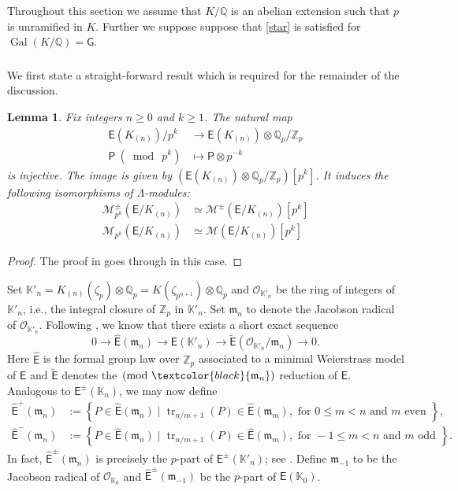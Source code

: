 \documentclass{amsart}
\newcommand{\edit}[1]{\textcolor{black}{#1}}
\newtheorem{lemma}[theorem]{Lemma}
\numberwithin{equation}{section}
\theoremstyle{remark}
\newcommand{\tr}{\operatorname{tr}}
\newcommand{\EC}{\mathsf{E}}
\newcommand{\fm}{\mathfrak{m}}
\newcommand{\cM}{\mathcal{M}}
\newcommand{\Gal}{\operatorname{Gal}}
\newcommand{\Qp}{\mathbb{Q}_p}
\newcommand{\Kn}{\mathbb{K}_{n}}
\newcommand{\K}{\mathbb{K}}
\newcommand{\Zp}{\mathbb{Z}_p}
\newcommand{\Q}{\mathbb{Q}}
\theoremstyle{plain} %
\begin{document}
Throughout this section we assume that $K/\Q$ is an abelian extension such that $p$ is unramified in $K$.
Further we suppose suppose that \ref{star} is satisfied for $\Gal(K/\Q) = \mathsf{G}$.


\subsubsection{}
We first state a straight-forward result which is required for the remainder of the discussion.

\begin{lemma}
\label{Antonio 5.8}
Fix integers $n \geq 0$ and $k \geq 1$.
The natural map 
\begin{align*}
\EC(K_{(n)})/p^k &\longrightarrow \EC(K_{(n)}) \otimes \Qp/\Zp \\
\mathsf{P} \ (\bmod \ p^k) & \mapsto \mathsf{P} \otimes p^{-k}
\end{align*} 
is injective.
The image is given by $(\EC(K_{(n)}) \otimes \Qp/\Zp)[p^k]$.
It induces the following isomorphisms of $\Lambda$-modules:
\begin{align*}
\cM^{\pm}_{p^k}(\EC/K_{(n)}) &\simeq \cM^{\pm}(\EC/K_{(n)})[p^k]\\
\cM_{p^k}(\EC/K_{(n)}) &\simeq \cM(\EC/K_{(n)})[p^k]
\end{align*}
\end{lemma}

\begin{proof}
The proof in \cite[Proposition~5.8]{Lei23} goes through in this case.
\end{proof}

Set $\K'_n = K_{(n)}(\zeta_p) \otimes \Qp = K(\zeta_{p^{n+1}}) \otimes \Qp$ and $\mathcal{O}_{\K'_n}$ be the ring of integers of $\K'_n$, i.e., the integral closure of $\Zp$ in $\K'_n$.
Set $\fm_n$ to denote the Jacobson radical of $\mathcal{O}_{\K'_n}$.
Following \cite[Proposition~VII.6.3]{Sil86}, we know that there exists a short exact sequence
\[
0 \longrightarrow \hat{\EC}(\fm_n) \longrightarrow \EC(\K'_n) \longrightarrow \widetilde{\EC}(\mathcal{O}_{\K'_n}/\fm_n) \longrightarrow 0.
\]
Here $\hat{\EC}$ is the formal group law over $\Zp$ associated to a minimal Weierstrass model of $\EC$ and $\widetilde{\EC}$ denotes the$\pmod \edit{\fm_n}$ reduction of $\EC$.
Analogous to $\EC^{\pm}(\Kn)$, we may now define
\begin{align*}
\hat{\EC}^+(\fm_n) &:=
\left\{P\in \hat{\EC}(\fm_n) \mid \tr_{n/m+1} (P)\in \hat{\EC}(\fm_m), \text{ for }0\leq m < n\text{ and }m \text{ even }\right\},\\
\hat{\EC}^-(\fm_n) &:=
\left\{P\in \hat{\EC}(\fm_n) \mid \tr_{n/m+1} (P)\in \hat{\EC}(\fm_{m}),\text{ for }-1\leq m < n\text{ and }m 
\text{ odd }\right\}.
\end{align*}
In fact, $\hat{\EC}^{\pm}(\fm_n)$ is precisely the $p$-part of $\EC^{\pm}(\K'_n)$; see \cite[Definition~4.20]{Kat21}.
Define $\fm_{-1}$ to be the Jacobson radical of $\mathcal{O}_{\K_0}$ and $\hat{\EC}^{\pm}(\fm_{-1})$ be the $p$-part of $\EC(\K_0)$.
\end{document}
